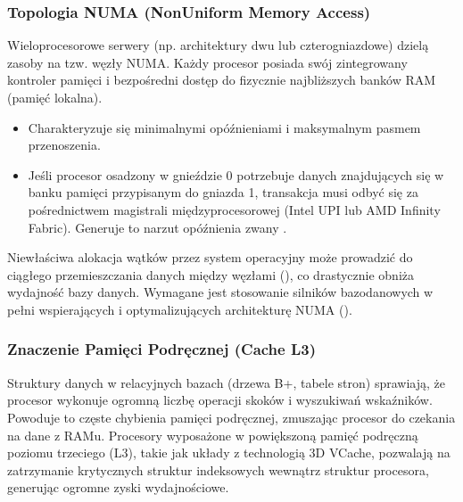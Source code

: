 \documentclass[a4paper,11pt,english,openany,oneside]{sphinxmanual}
\begin{document}
\subsubsection{Topologia NUMA (Non\sphinxhyphen{}Uniform Memory Access)}
\label{\detokenize{rozdzial_2/rozdzial_21/index:topologia-numa-non-uniform-memory-access}}
\sphinxAtStartPar
Wieloprocesorowe serwery (np. architektury dwu\sphinxhyphen{} lub czterogniazdowe) dzielą zasoby na tzw. węzły NUMA. Każdy procesor posiada swój zintegrowany kontroler pamięci i bezpośredni dostęp do fizycznie najbliższych banków RAM (pamięć lokalna).
\begin{itemize}
\item {} 
\sphinxAtStartPar
{} Charakteryzuje się minimalnymi opóźnieniami i maksymalnym pasmem przenoszenia.

\item {} 
\sphinxAtStartPar
{} Jeśli procesor osadzony w gnieździe 0 potrzebuje danych znajdujących się w banku pamięci przypisanym do gniazda 1, transakcja musi odbyć się za pośrednictwem magistrali międzyprocesorowej (Intel UPI lub AMD Infinity Fabric). Generuje to narzut opóźnienia zwany .

\end{itemize}

\sphinxAtStartPar
Niewłaściwa alokacja wątków przez system operacyjny może prowadzić do ciągłego przemieszczania danych między węzłami (), co drastycznie obniża wydajność bazy danych. Wymagane jest stosowanie silników bazodanowych w pełni wspierających i optymalizujących architekturę NUMA ().


\subsubsection{Znaczenie Pamięci Podręcznej (Cache L3)}
\label{\detokenize{rozdzial_2/rozdzial_21/index:znaczenie-pamieci-podrecznej-cache-l3}}
\sphinxAtStartPar
Struktury danych w relacyjnych bazach (drzewa B+, tabele stron) sprawiają, że procesor wykonuje ogromną liczbę operacji skoków i wyszukiwań wskaźników. Powoduje to częste chybienia pamięci podręcznej, zmuszając procesor do czekania na dane z RAM\sphinxhyphen{}u. Procesory wyposażone w powiększoną pamięć podręczną poziomu trzeciego (L3), takie jak układy z technologią 3D V\sphinxhyphen{}Cache, pozwalają na zatrzymanie krytycznych struktur indeksowych wewnątrz struktur procesora, generując ogromne zyski wydajnościowe.
\end{document}
